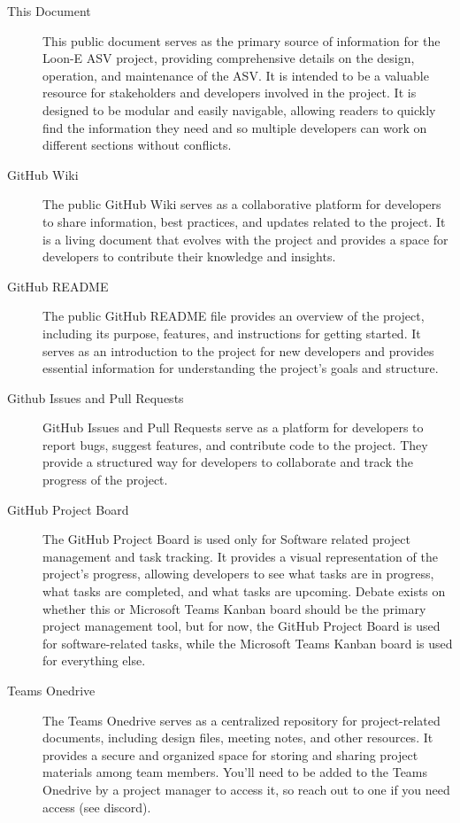 \begin{description}
    \item[This Document] 
        This public document serves as the primary source of information for the Loon-E ASV project, providing comprehensive details on the design, operation, and maintenance of the ASV. 
        It is intended to be a valuable resource for stakeholders and developers involved in the project.
        It is designed to be modular and easily navigable, allowing readers to quickly find the information they need and so multiple developers can work on different sections without conflicts.

    \item[GitHub Wiki] 
        The public GitHub Wiki serves as a collaborative platform for developers to share information, best practices, and updates related to the project. 
        It is a living document that evolves with the project and provides a space for developers to contribute their knowledge and insights.

    \item[GitHub README] 
        The public GitHub README file provides an overview of the project, including its purpose, features, and instructions for getting started. 
        It serves as an introduction to the project for new developers and provides essential information for understanding the project's goals and structure.

    \item[Github Issues and Pull Requests] 
        GitHub Issues and Pull Requests serve as a platform for developers to report bugs, suggest features, and contribute code to the project. 
        They provide a structured way for developers to collaborate and track the progress of the project.

    \item[GitHub Project Board] 
        The GitHub Project Board is used only for Software related project management and task tracking. 
        It provides a visual representation of the project's progress, allowing developers to see what tasks are in progress, what tasks are completed, and what tasks are upcoming.
        Debate exists on whether this or Microsoft Teams Kanban board should be the primary project management tool, but for now, the GitHub Project Board is used for software-related tasks, while the Microsoft Teams Kanban board is used for everything else.

    \item[Teams Onedrive]
        The Teams Onedrive serves as a centralized repository for project-related documents, including design files, meeting notes, and other resources. 
        It provides a secure and organized space for storing and sharing project materials among team members.
        You'll need to be added to the Teams Onedrive by a project manager to access it, so reach out to one if you need access (see discord).
\end{description}

